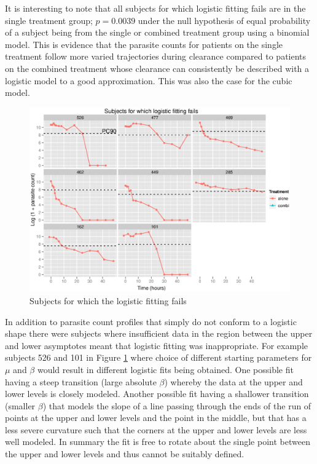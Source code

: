 It is interesting to note that all subjects for which logistic fitting fails are in the single treatment group; $p=0.0039$ under the null hypothesis of equal probability of a subject being from the single or combined treatment group using a binomial model. This is evidence that the parasite counts for patients on the single treatment follow more varied trajectories during clearance compared to patients on the combined treatment whose clearance can consistently be described with a logistic model to a good approximation. This was also the case for the cubic model.
\begin{figure}[h]
\includegraphics[width=6.1in]{failures.eps} 
\caption{Subjects for which the logistic fitting fails}\label{failures}
\end{figure}

In addition to parasite count profiles that simply do not conform to a logistic shape there were subjects where insufficient data in the region between the upper and lower asymptotes meant that logistic fitting was inappropriate. For example subjects 526 and 101 in Figure \ref{failures} where choice of different starting parameters for $\mu$ and $\beta$ would result in different logistic fits being obtained. One possible fit having a steep transition (large absolute $\beta$) whereby the data at the upper and lower levels is closely modeled. Another possible fit having a shallower transition (smaller $\beta$) that models the slope of a line passing through the ends of the run of points at the upper and lower levels and the point in the middle, but that has a less severe curvature such that the corners at the upper and lower levels are less well modeled. In summary the fit is free to rotate about the single point between the upper and lower levels and thus cannot be suitably defined.
